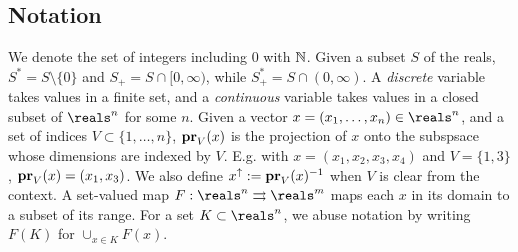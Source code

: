 %
%
%
%
%

\subsection{Notation}
We denote the set of integers including 0 with $\Ne$. 
Given a subset $S$ of the reals, $S^* = S \setminus \{0\}$ and $S_+ = S \cap [0,\infty)$,
while $S_+^* = S \cap (0,\infty)$.
A \emph{discrete} variable takes values in a finite set, and a \emph{continuous} variable takes values in a closed subset of $\reals^n$ for some $n$.
Given a vector $x = (x_1,\ldots,x_n) \in \reals^n$, and a set of indices $V \subset \{1,\ldots,n\}$, $\proj{x}{V}$ is the projection of $x$ onto the subspsace whose dimensions are indexed by $V$. 
E.g. with $x = (x_1,x_2,x_3,x_4)$ and $V=\{1,3\}$, $\proj{x}{V} = (x_1,x_3)$.
We also define $x^\uparrow \defeq \proj{x}{V}^{-1}$ when $V$ is clear from the context.
A set-valued map $F: \reals^n \rightrightarrows \reals^m$ maps each $x$ in its domain to a subset of its range.
For a set $K \subset \reals^n$, we abuse notation by writing $F(K)$ for $\cup_{x\in K}F(x)$.